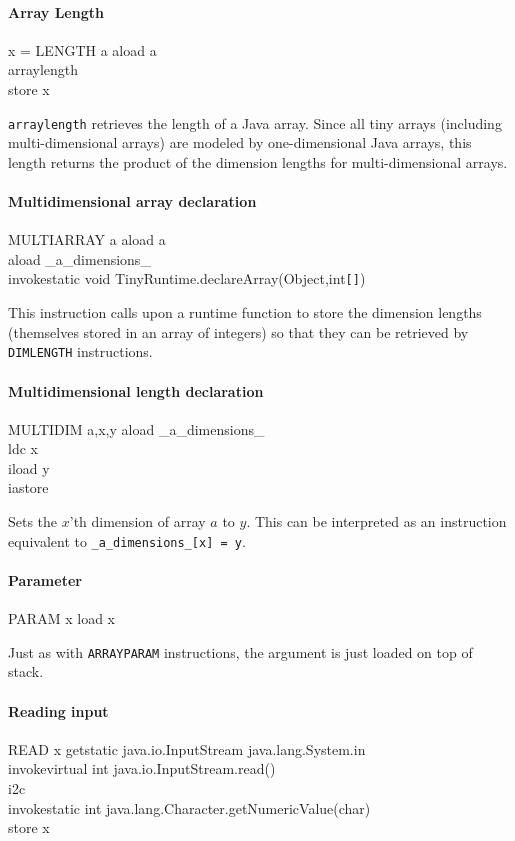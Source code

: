 \documentclass[a4paper]{article}
\begin{document}
\paragraph{Array Length\\}
\translate
{x = LENGTH a}
{
aload a\\
arraylength\\
store x
}

\texttt{arraylength} retrieves the length of a Java array. Since all tiny
arrays (including multi-dimensional arrays) are modeled by one-dimensional
Java arrays, this length returns the product of the dimension lengths for
multi-dimensional arrays.

\paragraph{Multidimensional array declaration\\}
\translate
{MULTIARRAY a}
{
aload a\\
aload \_a\_dimensions\_\\
invokestatic void TinyRuntime.declareArray(Object,int\texttt{[]})
}

This instruction calls upon a runtime function to store the dimension lengths
(themselves stored in an array of integers) so that they can be retrieved by
\texttt{DIMLENGTH} instructions.

\paragraph{Multidimensional length declaration\\}
\translate
{MULTIDIM a,x,y}
{
aload \_a\_dimensions\_\\
ldc x\\
iload y\\
iastore
}

Sets the $x$'th dimension of array $a$ to $y$. This can be interpreted as an
instruction equivalent to \texttt{\_a\_dimensions\_[x] = y}.

\paragraph{Parameter\\}
\translate
{PARAM x}
{load x}

Just as with \texttt{ARRAYPARAM} instructions, the argument is just loaded on
top of stack.

\paragraph{Reading input\\}
\translate
{READ x}
{
getstatic java.io.InputStream java.lang.System.in\\
invokevirtual int java.io.InputStream.read()\\
i2c\\
invokestatic int java.lang.Character.getNumericValue(char)\\
store x
}
\end{document}
